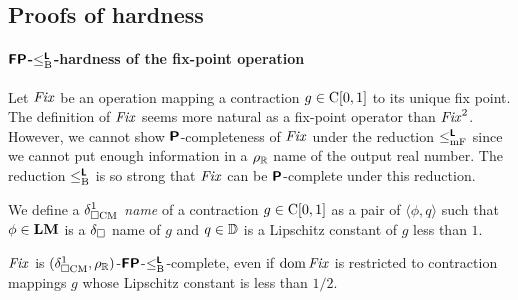 \documentclass[envcountsame,orivec,oribibl]{llncs}
\begin{document}
\subsection{Proofs of hardness}

\paragraph{$\text{\bfseries \sffamily \upshape FP}$-$\leq _{\mathrm B} ^{\text{\bfseries \sffamily \upshape L}}$-hardness of the fix-point operation}

Let $\mathit{Fix}$ be an operation mapping a contraction $g \in \mathrm C[0,1]$ 
to its unique fix point.
The definition of $\mathit{Fix}$ seems more natural as a fix-point operator than
$\mathit{Fix}^2$.
However, we cannot show $\text{\bfseries \sffamily \upshape P}$-completeness of $\mathit{Fix}$ 
under the reduction $\leq _{\mathrm{mF}} ^{\text{\bfseries \sffamily \upshape L}}$ since we cannot put enough information in
 a $\rho _\mathbb R$ name of the output real number.
The reduction $\leq _{\mathrm B} ^{\text{\bfseries \sffamily \upshape L}}$ is so strong that $\mathit{Fix}$ can 
be $\text{\bfseries \sffamily \upshape P}$-complete under this reduction.

We define a \emph{$\delta _{\square \mathrm{CM}}^1$ name} of a contraction $g \in \mathrm C[0,1]$
as a pair of $\langle \phi, q \rangle$ such that $\phi \in \mathbf{LM}$ is a 
$\delta _\square$ name of $g$ and $q \in \mathbb D$ is a Lipschitz constant of $g$ less than $1$.
\begin{lemma}
\label{lemma:P-hard-g_u}
$\mathit{Fix}$ is $(\delta _{\square \mathrm{CM}}^1, \rho _\mathbb R)$-$\text{\bfseries \sffamily \upshape FP}$-$\leq _{\mathrm B} ^{\text{\bfseries \sffamily \upshape L}}$-complete, 
 even if $\mathop{\rm dom} \mathit{Fix}$ is restricted to contraction mappings
$g$ whose Lipschitz constant is less than $1/2$.
\end{lemma}
\end{document}
